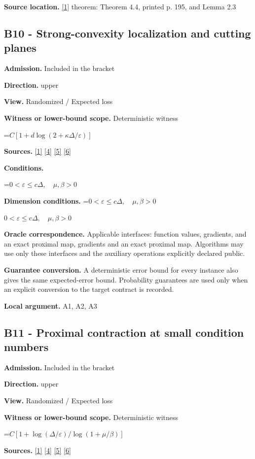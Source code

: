 \documentclass[10pt,a4paper]{article}
\newcommand{\AtlasMath}[1]{\par\begingroup\centering\setbox0=\hbox{$\displaystyle #1$}\ifdim\wd0>1.4\linewidth\typeout{ATLAS WIDE FORMULA: \the\wd0}\fi\ifdim\wd0>\linewidth\resizebox{\linewidth}{!}{\box0}\else\box0\fi\par\endgroup}
\newcommand{\AtlasInlineMath}[1]{\begingroup\setbox0=\hbox{$#1$}\ifdim\wd0>.4\linewidth\endgroup\AtlasMath{#1}\else\endgroup$#1$\fi}
\begin{document}
\textbf{Source location.} \href{https://www.tau.ac.il/~becka/FISTA.pdf}{[1]} theorem: Theorem 4.4, printed p. 195, and Lemma 2.3

\subsection{B10 - Strong-convexity localization and cutting planes}
\textbf{Admission.} Included in the bracket

\textbf{Direction.} upper

\textbf{View.} Randomized / Expected loss

\textbf{Witness or lower-bound scope.} Deterministic witness

\AtlasMath{C[1+d\log(2+\kappa\Delta/\varepsilon)]}
\textbf{Sources.} \href{https://www.tau.ac.il/~becka/FISTA.pdf}{[1]} \href{https://arxiv.org/pdf/1405.4980}{[4]} \href{https://www2.isye.gatech.edu/~nemirovs/MOR_AccuracyCertificates.pdf}{[5]} \href{https://arxiv.org/pdf/2609.20701}{[6]}

\textbf{Conditions.} 
\AtlasMath{0<\varepsilon\le c\Delta,\quad\mu,\beta>0}


\textbf{Dimension conditions.} \AtlasInlineMath{0<\varepsilon\le c\Delta,\quad\mu,\beta>0}

\textbf{Oracle correspondence.} Applicable interfaces: function values, gradients, and an exact proximal map, gradients and an exact proximal map. Algorithms may use only these interfaces and the auxiliary operations explicitly declared public.

\textbf{Guarantee conversion.} A deterministic error bound for every instance also gives the same expected-error bound. Probability guarantees are used only when an explicit conversion to the target contract is recorded.

\textbf{Local argument.} A1, A2, A3

\subsection{B11 - Proximal contraction at small condition numbers}
\textbf{Admission.} Included in the bracket

\textbf{Direction.} upper

\textbf{View.} Randomized / Expected loss

\textbf{Witness or lower-bound scope.} Deterministic witness

\AtlasMath{C[1+\log(\Delta/\varepsilon)/\log(1+\mu/\beta)]}
\textbf{Sources.} \href{https://www.tau.ac.il/~becka/FISTA.pdf}{[1]} \href{https://arxiv.org/pdf/1405.4980}{[4]} \href{https://www2.isye.gatech.edu/~nemirovs/MOR_AccuracyCertificates.pdf}{[5]} \href{https://arxiv.org/pdf/2609.20701}{[6]}
\end{document}

